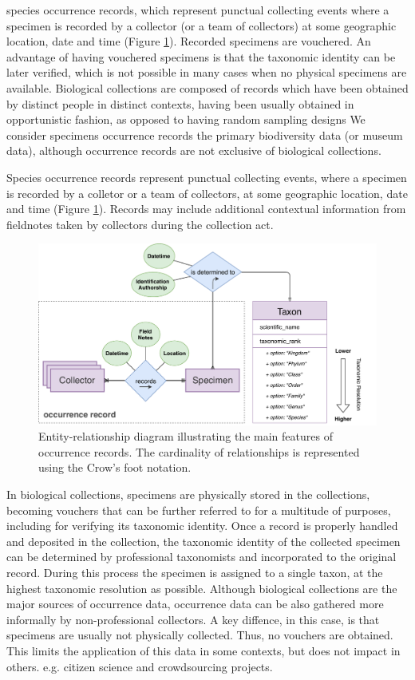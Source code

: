 species occurrence records, which represent punctual collecting events where a specimen is recorded by a collector (or a team of collectors) at some geographic location, date and time (Figure \ref{fig:occurrences_er}).
Recorded specimens are vouchered.
An advantage of having vouchered specimens is that the taxonomic identity can be later verified, which is not possible in many cases when no physical specimens are available.
Biological collections are composed of records which have been obtained by distinct people in distinct contexts, having been usually obtained in opportunistic fashion, as opposed to having random sampling designs %
We consider specimens occurrence records the primary biodiversity data (or museum data), although occurrence records are not exclusive of biological collections.

Species occurrence records represent punctual collecting events, where a specimen is recorded by a colletor or a team of collectors, at some geographic location, date and time (Figure \ref{fig:occurrences_er}).
Records may include additional contextual information from fieldnotes taken by collectors during the collection act.
\begin{figure}[h!]
  	\centering
    \includegraphics[width=\linewidth]{figures/collections_data/occurrences_er.pdf}
    \caption{Entity-relationship diagram illustrating the main features of occurrence records. The cardinality of relationships is represented using the Crow's foot notation.}
    \label{fig:occurrences_er}
\end{figure}

In biological collections, specimens are physically stored in the collections, becoming vouchers that can be further referred to for a multitude of purposes, including for verifying its taxonomic identity.
Once a record is properly handled and deposited in the collection, the taxonomic identity of the collected specimen can be determined by professional taxonomists and incorporated to the original record. 
During this process the specimen is assigned to a single taxon, at the highest taxonomic resolution as possible.
Although biological collections are the major sources of occurrence data, occurrence data can be also gathered more informally by non-professional collectors.
A key diffence, in this case, is that specimens are usually not physically collected. Thus, no vouchers are obtained.
This limits the application of this data in some contexts, but does not impact in others.
 e.g. citizen science and crowdsourcing projects.


